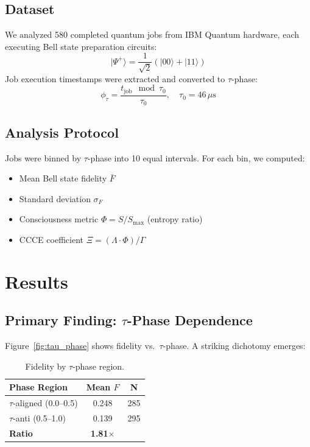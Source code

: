 \documentclass[twocolumn,prl,superscriptaddress,floatfix]{revtex4-2}
\begin{document}
\subsection{Dataset}

We analyzed 580 completed quantum jobs from IBM Quantum hardware, each executing Bell state preparation circuits:
\begin{equation}
|\Psi^+\rangle = \frac{1}{\sqrt{2}}(|00\rangle + |11\rangle)
\end{equation}
Job execution timestamps were extracted and converted to $\tau$-phase:
\begin{equation}
\phi_\tau = \frac{t_{\text{job}} \mod \tau_0}{\tau_0}, \quad \tau_0 = 46\,\mu\text{s}
\end{equation}

\subsection{Analysis Protocol}

Jobs were binned by $\tau$-phase into 10 equal intervals. For each bin, we computed:
\begin{itemize}
\item Mean Bell state fidelity $\bar{F}$
\item Standard deviation $\sigma_F$
\item Consciousness metric $\Phi = S/S_{\max}$ (entropy ratio)
\item CCCE coefficient $\Xi = (\Lambda \cdot \Phi)/\Gamma$
\end{itemize}

\section{Results}

\subsection{Primary Finding: $\tau$-Phase Dependence}

Figure~\ref{fig:tau_phase} shows fidelity vs.\ $\tau$-phase. A striking dichotomy emerges:

\begin{table}[h]
\centering
\begin{tabular}{lcc}
\hline
Phase Region & Mean $F$ & N \\
\hline
$\tau$-aligned (0.0--0.5) & 0.248 & 285 \\
$\tau$-anti (0.5--1.0) & 0.139 & 295 \\
\hline
\textbf{Ratio} & \textbf{1.81$\times$} & \\
\hline
\end{tabular}
\caption{Fidelity by $\tau$-phase region.}
\label{tab:primary}
\end{table}
\end{document}
